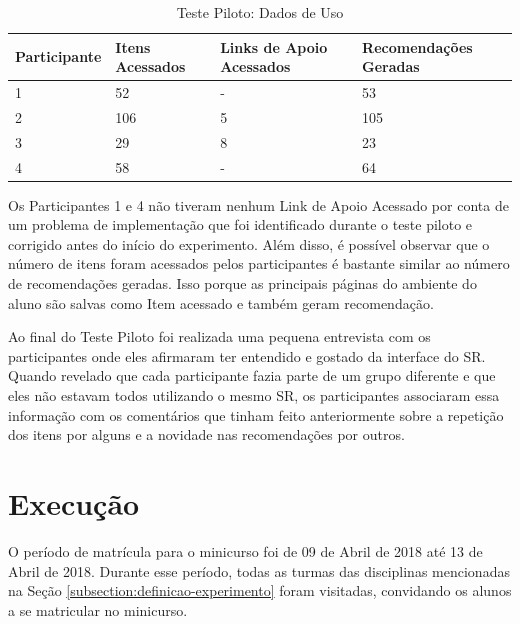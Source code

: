 \begin{table}[h]
\footnotesize
\caption[Teste Piloto: Dados de Uso]{Teste Piloto: Dados de Uso}
\label{tab:teste-piloto-dados-de-uso}
\centering
\begin{tabular}{|p{2cm}|p{3cm}|p{3cm}|p{3cm}|}
  \hline
  \textbf{Participante} & \textbf{Itens Acessados} & \textbf{Links de Apoio Acessados} & \textbf{Recomendações Geradas} \\
  \hline
  1            & 52              & -                        & 53                    \\
  \hline
  2            & 106             & 5                        & 105                   \\
  \hline
  3            & 29              & 8                        & 23                    \\
  \hline
  4            & 58              & -                        & 64                    \\
  \hline
\end{tabular}
\end{table}

Os Participantes 1 e 4 não tiveram nenhum Link de Apoio Acessado por conta de um problema de implementação que foi identificado
durante o teste piloto e corrigido antes do início do experimento. Além disso, é possível observar que o número de itens foram acessados pelos participantes é bastante
similar ao número de recomendações geradas. Isso porque as principais páginas do ambiente do aluno são salvas como Item acessado
e também geram recomendação.

Ao final do Teste Piloto foi realizada uma pequena entrevista com os participantes onde eles afirmaram ter entendido e gostado
da interface do SR. Quando revelado que cada participante fazia parte de um grupo diferente e que eles
não estavam todos utilizando o mesmo SR, os participantes associaram essa informação com os
comentários que tinham feito anteriormente sobre a repetição dos itens por alguns e a novidade nas recomendações por outros.

\section{Execução}\label{section:execucao-experimento}

O período de matrícula para o minicurso foi de 09 de Abril de 2018 até 13 de Abril de 2018. Durante esse período, todas as turmas
das disciplinas mencionadas na Seção \ref{subsection:definicao-experimento} foram visitadas, convidando os alunos a se matricular no minicurso.

